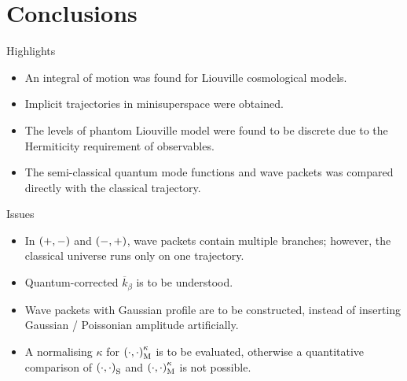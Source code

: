 \documentclass[9pt]{beamer}
\begin{document}
\section{Conclusions}

\begin{frame}%
{Highlights}%
\begin{itemize}
\item An \alert{integral of motion} was found for Liouville cosmological
models.
\item \alert{Implicit trajectories} in minisuperspace were obtained.
\item The levels of phantom Liouville model were found to be \alert{discrete}
due to the Hermiticity requirement of observables.
\item The semi-classical quantum mode functions and wave packets was compared
directly with the classical trajectory.
\end{itemize}
\end{frame}

\begin{frame}%
{Issues}%
\begin{itemize}
\item In ${\left(+,-\right)}$ and ${\left(-,+\right)}$, wave packets contain multiple branches;
however, the classical universe runs only on one trajectory.
\item Quantum-corrected $\overline{k}_\beta$ is to be understood.
\item Wave packets with Gaussian profile are to be constructed, instead of
inserting Gaussian / Poissonian amplitude artificially.
\item A normalising $\kappa$ for ${\left(\cdot,\cdot\right)}_\text{M}^\kappa$ is to be 
evaluated, otherwise a quantitative comparison of
${\left(\cdot,\cdot\right)}_\text{S}$ and ${\left(\cdot,\cdot\right)}_\text{M}^\kappa$ is not
possible.
\end{itemize}
\end{frame}
\end{document}
